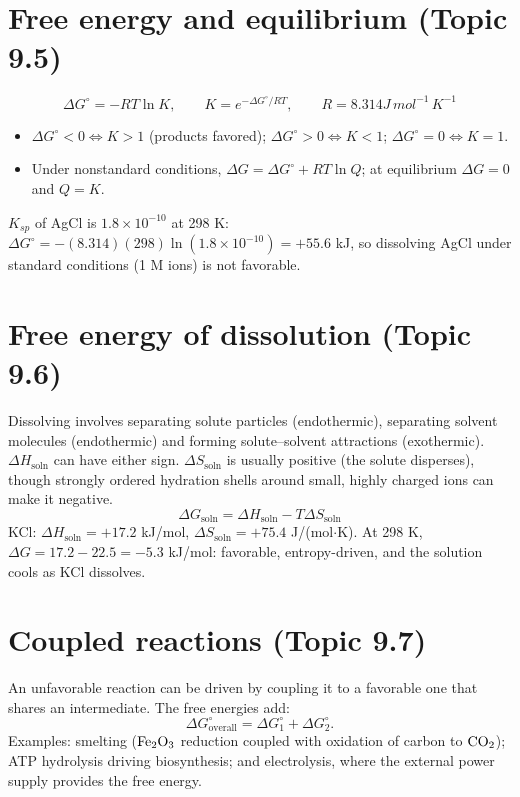 \documentclass[11pt]{article}
\begin{document}
\section{Free energy and equilibrium (Topic 9.5)}\label{t:9.5}
\[ \Delta G^\circ = -RT\ln K, \qquad K = e^{-\Delta G^\circ/RT}, \qquad R = 8.314\unit{J\,mol^{-1}\,K^{-1}} \]
\begin{itemize}
\item $\Delta G^\circ < 0 \Leftrightarrow K > 1$ (products favored); $\Delta G^\circ > 0 \Leftrightarrow K < 1$; $\Delta G^\circ = 0 \Leftrightarrow K = 1$.
\item Under nonstandard conditions, $\Delta G = \Delta G^\circ + RT\ln Q$; at equilibrium $\Delta G = 0$ and $Q = K$.
\end{itemize}
 $K_{sp}$ of AgCl is $1.8\times10^{-10}$ at 298 K: $\Delta G^\circ = -(8.314)(298)\ln(1.8\times10^{-10}) = +55.6$ kJ, so dissolving AgCl under standard conditions (1 M ions) is not favorable.

\section{Free energy of dissolution (Topic 9.6)}\label{t:9.6}
Dissolving involves separating solute particles (endothermic), separating solvent molecules (endothermic) and forming solute--solvent attractions (exothermic). $\Delta H_{\text{soln}}$ can have either sign. $\Delta S_{\text{soln}}$ is usually positive (the solute disperses), though strongly ordered hydration shells around small, highly charged ions can make it negative.
\[ \Delta G_{\text{soln}} = \Delta H_{\text{soln}} - T\Delta S_{\text{soln}} \]
 KCl: $\Delta H_{\text{soln}} = +17.2$ kJ/mol, $\Delta S_{\text{soln}} = +75.4$ J/(mol$\cdot$K). At 298 K, $\Delta G = 17.2 - 22.5 = -5.3$ kJ/mol: favorable, entropy-driven, and the solution cools as KCl dissolves.

\section{Coupled reactions (Topic 9.7)}\label{t:9.7}
An unfavorable reaction can be driven by coupling it to a favorable one that shares an intermediate. The free energies add:
\[ \Delta G^\circ_{\text{overall}} = \Delta G^\circ_1 + \Delta G^\circ_2. \]
Examples: smelting ($\ce{Fe2O3}$ reduction coupled with oxidation of carbon to $\ce{CO2}$); ATP hydrolysis driving biosynthesis; and electrolysis, where the external power supply provides the free energy.
\end{document}
